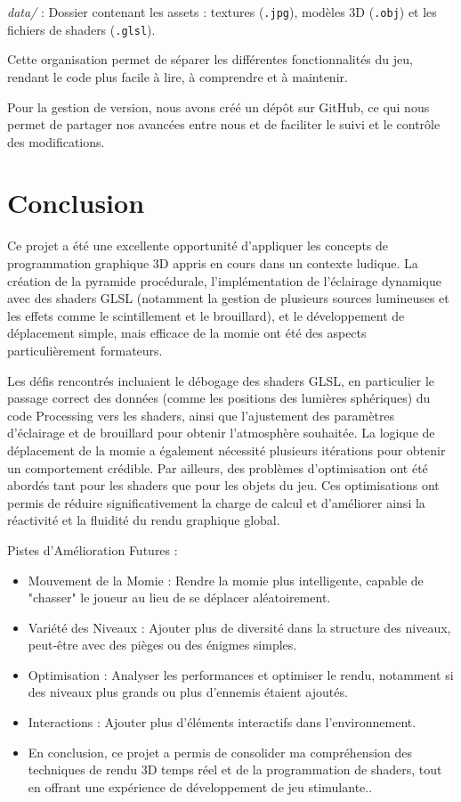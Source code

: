 \documentclass[12pt,oneside,letterpaper]{article}
\begin{document}
\textit{data/} : Dossier contenant les assets : textures (\texttt{.jpg}), modèles 3D (\texttt{.obj}) et les fichiers de shaders (\texttt{.glsl}).

Cette organisation permet de séparer les différentes fonctionnalités du jeu, rendant le code plus facile à lire, à comprendre et à maintenir.

Pour la gestion de version, nous avons créé un dépôt sur GitHub, ce qui nous permet de partager nos avancées entre nous et de faciliter le suivi et le contrôle des modifications.

\section{Conclusion}
Ce projet a été une excellente opportunité d'appliquer les concepts de programmation graphique 3D appris en cours dans un contexte ludique. La création de la pyramide procédurale, l'implémentation de l'éclairage dynamique avec des shaders GLSL (notamment la gestion de plusieurs sources lumineuses et les effets comme le scintillement et le brouillard), et le développement de déplacement simple, mais efficace de la momie ont été des aspects particulièrement formateurs.

Les défis rencontrés incluaient le débogage des shaders GLSL, en particulier le passage correct des données (comme les positions des lumières sphériques) du code Processing vers les shaders, ainsi que l'ajustement des paramètres d'éclairage et de brouillard pour obtenir l'atmosphère souhaitée. La logique de déplacement de la momie a également nécessité plusieurs itérations pour obtenir un comportement crédible. Par ailleurs, des problèmes d’optimisation ont été abordés tant pour les shaders que pour les objets du jeu. Ces optimisations ont permis de réduire significativement la charge de calcul et d'améliorer ainsi la réactivité et la fluidité du rendu graphique global.

Pistes d'Amélioration Futures :

\begin{itemize}
    \item 
        Mouvement de la Momie : Rendre la momie plus intelligente, capable de "chasser" le joueur au lieu de se déplacer aléatoirement.
    \item
        Variété des Niveaux : Ajouter plus de diversité dans la structure des niveaux, peut-être avec des pièges ou des énigmes simples.
    \item
        Optimisation : Analyser les performances et optimiser le rendu, notamment si des niveaux plus grands ou plus d'ennemis étaient ajoutés.
    \item
        Interactions : Ajouter plus d'éléments interactifs dans l'environnement.
    \item
        En conclusion, ce projet a permis de consolider ma compréhension des techniques de rendu 3D temps réel et de la programmation de shaders, tout en offrant une expérience de développement de jeu stimulante..
\end{itemize}
\end{document}
